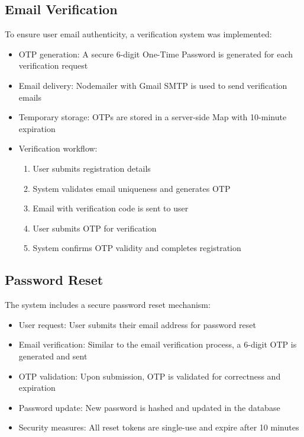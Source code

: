 \documentclass{article}
\begin{document}
\subsection{Email Verification}
To ensure user email authenticity, a verification system was implemented:
\begin{itemize}
    \item OTP generation: A secure 6-digit One-Time Password is generated for each verification request
    \item Email delivery: Nodemailer with Gmail SMTP is used to send verification emails
    \item Temporary storage: OTPs are stored in a server-side Map with 10-minute expiration
    \item Verification workflow: 
    \begin{enumerate}
        \item User submits registration details
        \item System validates email uniqueness and generates OTP
        \item Email with verification code is sent to user
        \item User submits OTP for verification
        \item System confirms OTP validity and completes registration
    \end{enumerate}
\end{itemize}

\subsection{Password Reset}
The system includes a secure password reset mechanism:
\begin{itemize}
    \item User request: User submits their email address for password reset
    \item Email verification: Similar to the email verification process, a 6-digit OTP is generated and sent
    \item OTP validation: Upon submission, OTP is validated for correctness and expiration
    \item Password update: New password is hashed and updated in the database
    \item Security measures: All reset tokens are single-use and expire after 10 minutes
\end{itemize}
\end{document}

